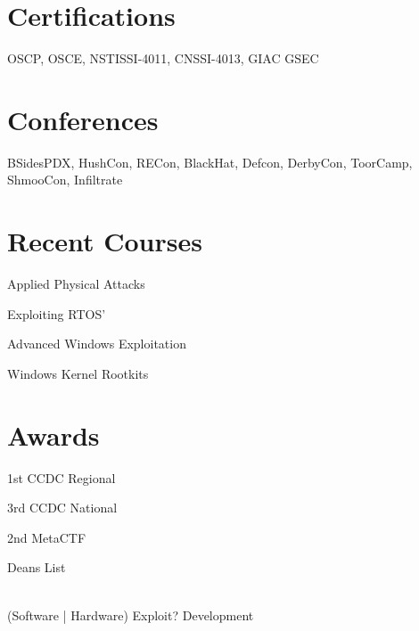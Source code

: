 \documentclass[]{hieudo-build}
\begin{document}
\begin{minipage}[t]{0.34\textwidth}
		\section{Certifications}
		OSCP, OSCE, NSTISSI-4011, CNSSI-4013, GIAC GSEC
		\section{Conferences} 
		BSidesPDX, HushCon, RECon, BlackHat, Defcon, DerbyCon, ToorCamp, ShmooCon, Infiltrate
		\section{Recent Courses}
		\begin{tightemize}
		\item Applied Physical Attacks
		\item Exploiting RTOS'
		\item Advanced Windows Exploitation
		\item Windows Kernel Rootkits
		\end{tightemize}
		
		\section{Awards} 
		\begin{tightemize}
		\item 1st CCDC Regional
		\item 3rd CCDC National
		\item 2nd MetaCTF
		\item Deans List
		\end{tightemize}
		\sectionsep
		\\(Software | Hardware) Exploit? Development\hspace{28em}
		
	\end{minipage} 
\end{document}
